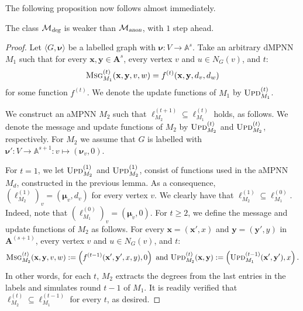 The following proposition now follows almost immediately.
\begin{proposition}\label{prop:onestep}
The class $\mathcal{M}_{\textsl{deg}}$ is weaker than 
$\mathcal{M}_{\textsl{anon}}$, with $1$ step ahead.
\end{proposition}
\begin{proof}
Let $\langle G,\pmb{\nu}\rangle$ be a labelled graph with $\pmb{\nu}:V\to\mathbb{A}^s$. Take an arbitrary dMPNN $M_1$ such that
for every $\mathbf{x},\mathbf{y}\in\mathbf{A}^{s}$, every vertex $v$ and $u\in N_G(v)$, and $t$:
$$
\textsc{Msg}_{M_1}^{(t)}(\mathbf{x},\mathbf{y},v,w)=f^{(t)}(\mathbf{x},\mathbf{y},d_v,d_w)$$
for some function $f^{(t)}$. We denote the update functions of $M_1$ by
$\textsc{Upd}_{M_1}^{(t)}$. 

We construct an aMPNN $M_2$ such that $\pmb{\ell}_{M_2}^{(t+1)}\subseteq \pmb{\ell}_{M_1}^{(t)}$
holds, as follows. We denote the message and update functions of $M_2$
by $\textsc{Upd}_{M_2}^{(t)}$ and $\textsc{Upd}_{M_2}^{(t)}$, respectively. For $M_2$ we assume that $G$ is labelled with
$\pmb{\nu}':V\to\mathbb{A}^{s+1}:v\mapsto(\pmb{\nu}_v,0)$.

For $t=1$, we let $\textsc{Upd}_{M_2}^{(1)}$ and $\textsc{Upd}_{M_2}^{(1)}$, consist of functions used in the aMPNN $M_d$, constructed in the previous lemma. As a consequence, $(\pmb{\ell}_{M_2}^{(1)})_v=(\pmb{\mu}_v,d_v)$ for every vertex $v$. 
We clearly have that $\pmb{\ell}_{M_2}^{(1)}\subseteq \pmb{\ell}_{M_1}^{(0)}$. Indeed, note that $(\pmb{\ell}_{M_1}^{(0)})_v=(\pmb{\mu}_v,0)$. For $t\geq 2$, we define the message and update functions of $M_2$ as follows. For every $\mathbf{x}=(\mathbf{x}',x)$ and $\mathbf{y}=(\mathbf{y}',y)$ in $\mathbf{A}^{(s+1)}$, every vertex $v$ and $u\in N_G(v)$, and $t$:
$$
\textsc{Msg}_{M_2}^{(t)}(\mathbf{x},\mathbf{y},v,w):=\left(f^{(t-1)}(\mathbf{x}',\mathbf{y}',x,y),0\right)
\text{ and } \textsc{Upd}_{M_2}^{(t)}(\mathbf{x},\mathbf{y}):=\left(\textsc{Upd}_{M_1}^{(t-1)}(\mathbf{x}',\mathbf{y'}),x\right).
$$
In other words, for each $t$, $M_2$ extracts the degrees from the last entries in the labels and simulates round $t-1$ of $M_1$. It is readily verified that $\pmb{\ell}_{M_2}^{(t)}\subseteq \pmb{\ell}_{M_1}^{(t-1)}$ for every $t$, as desired.
\end{proof}




